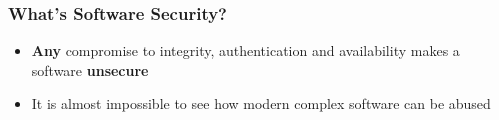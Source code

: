\begin{frame}
\frametitle{What's Software Security?}
\begin{itemize}
	\item \textbf{Any} compromise to integrity, authentication and availability makes a software \textbf{unsecure}
	\item<2->{It is almost impossible to see how modern complex software can be abused}
\end{itemize}
\end{frame}